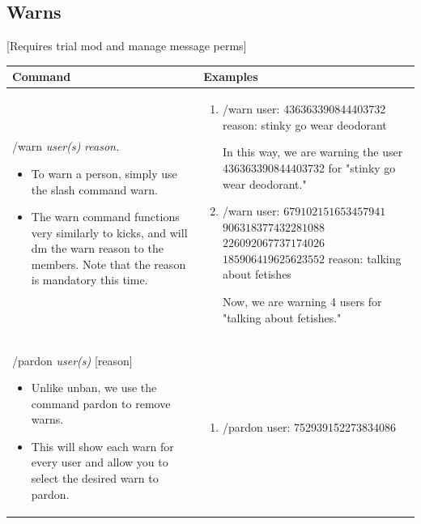 \documentclass{scrartcl}
\begin{document}
\subsection{Warns} [Requires trial mod and manage message perms]
\begin{tabularx}{\textwidth}{|>{\raggedright\arraybackslash}X|>{\raggedright\arraybackslash}X|}
\hline 
Command & Examples\\
\hline
/warn \textit{user(s)} \textit{reason.}

\begin{itemize}
    \item To warn a person, simply use the slash command warn.
    
    \item The warn command functions very similarly to kicks, and will dm the warn reason to the members. Note that the reason is mandatory this time. 
\end{itemize}
& \begin{enumerate}
    \item 
    /warn \color{black} user: \color{gray}436363390844403732 \color{black} reason: \color{gray}stinky go wear deodorant\color{black}
    
    In this way, we are warning the user 436363390844403732 for "stinky go wear deodorant."
    \item
    /warn \color{black} user: \color{gray}$679102151653457941$ $906318377432281088$ $226092067737174026$ $185906419625623552$ \color{black} reason: \color{gray} talking about fetishes \color{black}
    
    Now, we are warning 4 users for "talking about fetishes."
\end{enumerate}\\
\hline
/pardon \textit{user(s)} [reason]
\begin{itemize}
    \item Unlike unban, we use the command pardon to remove warns. 
    
    \item This will show each warn for every user and allow you to select the desired warn to pardon.
\end{itemize}&
\begin{enumerate}
    \item /pardon user: \color{gray} 752939152273834086  \color{black}
    

\end{enumerate}
\end{tabularx}
\end{document}
